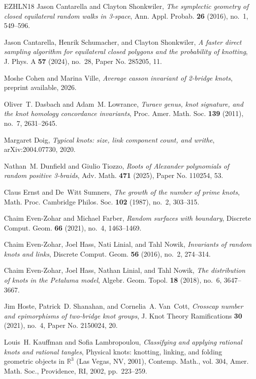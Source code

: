 \documentclass[11pt]{amsart}
\theoremstyle{definition}
\theoremstyle{remark}
\numberwithin{equation}{section}
\begin{document}
\begin{thebibliography}{EZHLN18}
Jason Cantarella and Clayton Shonkwiler, \emph{The symplectic geometry of
  closed equilateral random walks in 3-space}, Ann. Appl. Probab. \textbf{26}
  (2016), no.~1, 549--596.

Jason Cantarella, Henrik Schumacher, and Clayton Shonkwiler, \emph{A faster
  direct sampling algorithm for equilateral closed polygons and the probability
  of knotting}, J. Phys. A \textbf{57} (2024), no.~28, Paper No. 285205, 11.

Moshe Cohen and Marina Ville, \emph{Average casson invariant of 2-bridge
  knots}, preprint available, 2026.

Oliver~T. Dasbach and Adam~M. Lowrance, \emph{Turaev genus, knot signature, and
  the knot homology concordance invariants}, Proc. Amer. Math. Soc.
  \textbf{139} (2011), no.~7, 2631--2645.

Margaret Doig, \emph{Typical knots: size, link component count, and writhe},
  arXiv:2004.07730, 2020.

Nathan~M. Dunfield and Giulio Tiozzo, \emph{Roots of {A}lexander polynomials of
  random positive 3-braids}, Adv. Math. \textbf{471} (2025), Paper No. 110254,
  53.

Claus Ernst and De~Witt Sumners, \emph{The growth of the number of prime
  knots}, Math. Proc. Cambridge Philos. Soc. \textbf{102} (1987), no.~2,
  303--315.

Chaim Even-Zohar and Michael Farber, \emph{Random surfaces with boundary},
  Discrete Comput. Geom. \textbf{66} (2021), no.~4, 1463--1469.

Chaim Even-Zohar, Joel Hass, Nati Linial, and Tahl Nowik, \emph{Invariants of
  random knots and links}, Discrete Comput. Geom. \textbf{56} (2016), no.~2,
  274--314.

Chaim Even-Zohar, Joel Hass, Nathan Linial, and Tahl Nowik, \emph{The
  distribution of knots in the {P}etaluma model}, Algebr. Geom. Topol.
  \textbf{18} (2018), no.~6, 3647--3667.

Jim Hoste, Patrick~D. Shanahan, and Cornelia~A. Van~Cott, \emph{Crosscap number
  and epimorphisms of two-bridge knot groups}, J. Knot Theory Ramifications
  \textbf{30} (2021), no.~4, Paper No. 2150024, 20.

Louis~H. Kauffman and Sofia Lambropoulou, \emph{Classifying and applying
  rational knots and rational tangles}, Physical knots: knotting, linking, and
  folding geometric objects in {$\mathbb R^3$} ({L}as {V}egas, {NV}, 2001),
  Contemp. Math., vol. 304, Amer. Math. Soc., Providence, RI, 2002,
  pp.~223--259.


\end{thebibliography}
\end{document}
